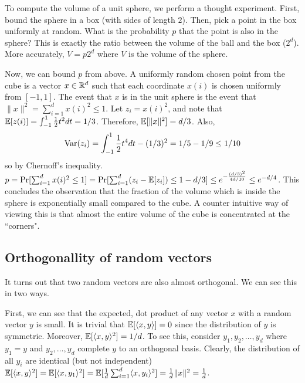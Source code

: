 \documentclass{article}
\begin{document}
To compute the volume of a unit sphere, we perform a thought experiment.
First, bound the sphere in a box (with sides of length $2$).
Then, pick a point in the box uniformly at random. What is the probability $p$ that
the point is also in the sphere? This is exactly the ratio between the volume of the ball and the box ($2^d$).
More accurately, $V = p2^d$ where $V$ is the volume of the sphere.

Now, we can bound $p$ from above. 
A uniformly random chosen point from the cube is a vector $x \in {\mathbb{R}}^d$ such that each coordinate $x(i)$
is chosen uniformly from $[-1,1]$. The event that $x$ is in the unit sphere is the event that $\|x\|^2 = \sum_{i=1}^{d}x(i)^2 \le 1$.
Let $z_i = x(i)^2$, and note that 
${\mathbb E}[z(i)] = \int_{-1}^{1}\frac{1}{2}t^2 dt = 1/3$. Therefore, ${\mathbb E}[\|x\|^2] = d/3$. 
Also, 
\[
{\operatorname{Var}}(z_i)  = \int_{-1}^{1}\frac{1}{2}t^4 dt  - (1/3)^2  = 1/5 - 1/9 \le 1/10
\]
so by Chernoff's inequality.
$p = \Pr[\sum_{i=1}^{d}x(i)^2 \le 1]  = \Pr[\sum_{i=1}^{d}(z_i -{\mathbb E}[z_i] ) \le 1-d/3] \le e^{-\frac{(d/3)^2}{4d/10}} \le e^{-d/4}$.
This concludes the observation that the fraction of the volume which is inside the sphere is 
exponentially small compared to the cube.
A counter intuitive way of viewing this is that almost the entire volume of the cube is concentrated at the ``corners".

\subsection{Orthogonallity of random vectors}

It turns out that two random vectors are also almost orthogonal.
We can see this in two ways.

First, we can see that the expected, dot product of any vector $x$ with a random vector $y$ is small.
It is trivial that ${\mathbb E}[\langle x,y \rangle] = 0$ since the distribution of $y$ is symmetric.
Moreover, ${\mathbb E}[\langle x,y \rangle^2] = 1/d$.
To see this, consider $y_1,y_2,\ldots,y_d$ where $y_1 = y$ and $y_2,\ldots,y_d$ complete $y$ to an orthogonal basis.
Clearly, the distribution of all $y_i$ are identical (but not independent)
${\mathbb E}[\langle x,y \rangle^2] = {\mathbb E}[\langle x,y_1\rangle^2] = {\mathbb E}[\frac{1}{d}\sum_{i=1}^{d}\langle x,y_i\rangle^2] = \frac{1}{d}\|x\|^2 = \frac{1}{d}$.
\end{document}
